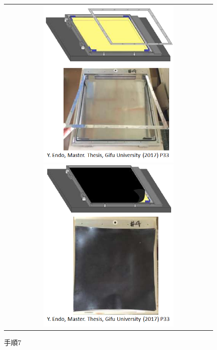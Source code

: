\documentclass[12pt,a4paper]{jarticle}
\begin{document}
\begin{figure}[htbp]
  \centering
      \begin{tabular}{c}
        \begin{minipage}{0.5\hsize}
          \centering
            \includegraphics[clip, width=70mm]{tezyun_6.png}
            \hspace{1.6cm} 
            \caption{手順6\label{fig:tezyun_6}}
        \end{minipage}
        
        \begin{minipage}{0.5\hsize}
          \centering
            \includegraphics[clip, width=70mm]{tezyun_7.png}
            \hspace{1.6cm} 
            \caption{手順7\label{fig:tezyun_7}}
        \end{minipage}
    
      \end{tabular}
\end{figure}
\end{document}
